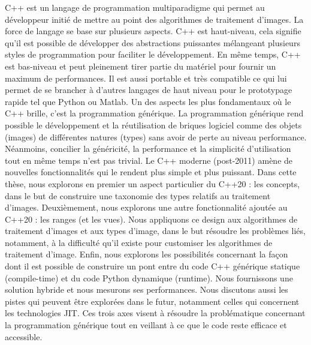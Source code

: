 \noindent C++ est un langage de programmation multiparadigme qui permet au développeur initié de mettre au point des
algorithmes de traitement d'images. La force de langage se base sur plusieurs aspects. C++ est haut-niveau, cela
signifie qu'il est possible de développer des abstractions puissantes mélangeant plusieurs styles de programmation pour
faciliter le développement. En même temps, C++ est bas-niveau et peut pleinement tirer partie du matériel pour fournir
un maximum de performances. Il est aussi portable et très compatible ce qui lui permet de se brancher à d'autres
langages de haut niveau pour le prototypage rapide tel que Python ou Matlab. Un des aspects les plus fondamentaux où le
C++ brille, c'est la programmation générique. La programmation générique rend possible le développement et la
réutilisation de briques logiciel comme des objets (images) de différentes natures (types) sans avoir de perte au niveau
performance. Néanmoins, concilier la généricité, la performance et la simplicité d'utilisation tout en même temps n'est
pas trivial. Le C++ moderne (post-2011) amène de nouvelles fonctionnalités qui le rendent plus simple et plus puissant.
Dans cette thèse, nous explorons en premier un aspect particulier du C++20 : les concepts, dans le but de construire une
taxonomie des types relatifs au traitement d'images. Deuxièmement, nous explorons une autre fonctionnalité ajoutée au
C++20 : les ranges (et les vues). Nous appliquons ce design aux algorithmes de traitement d'images et aux types d'image,
dans le but résoudre les problèmes liés, notamment, à la difficulté qu'il existe pour customiser les algorithmes de
traitement d'image. Enfin, nous explorons les possibilités concernant la façon dont il est possible de construire un
pont entre du code C++ générique statique (compile-time) et du code Python dynamique (runtime). Nous fournissons une
solution hybride et nous mesurons ses performances. Nous discutons aussi les pistes qui peuvent être explorées dans le
futur, notamment celles qui concernent les technologies JIT. Ces trois axes visent à résoudre la problématique
concernant la programmation générique tout en veillant à ce que le code reste efficace et accessible.
